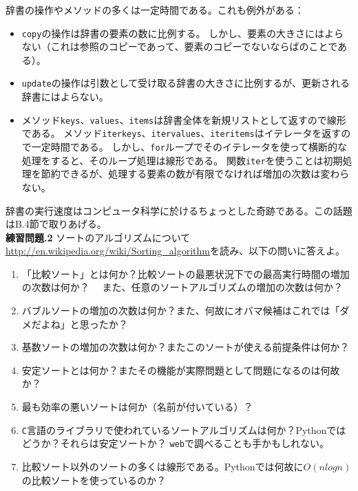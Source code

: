 \documentclass[a4j,12pt,makeidx]{jbook}
\newcommand{\tp}{\thechapter}
\begin{document}
辞書の操作やメソッドの多くは一定時間である。これも例外がある：
\begin{itemize}
\item {\tt copy}の操作は辞書の要素の数に比例する。
しかし、要素の大きさにはよらない（これは参照のコピーであって、要素のコピーでないならばのことである）。
\item {\tt update}の操作は引数として受け取る辞書の大きさに比例するが、更新される辞書にはよらない。
\item メソッド{\tt keys}、{\tt values}、{\tt items}は辞書全体を新規リストとして返すので線形である。
メソッド{\tt iterkeys}、{\tt itervalues}、{\tt iteritems}はイテレータを返すので一定時間である。
しかし、{\tt for}ループでそのイテレータを使って横断的な処理をすると、そのループ処理は線形である。
関数{\tt iter}を使うことは初期処理を節約できるが、処理する要素の数が有限でなければ増加の次数は変わらない。
\end{itemize}
辞書の実行速度はコンピュータ科学に於けるちょっとした奇跡である。この話題はB.4節で取りあげる。\\

\noindent
{\bf 練習問題\tp.2} ソートのアルゴリズムについて
\url{http://en.wikipedia.org/wiki/Sorting_algorithm}を読み、以下の問いに答えよ。
\begin{enumerate}
\item 「比較ソート」とは何か？比較ソートの最悪状況下での最高実行時間の増加の次数は何か？
　また、任意のソートアルゴリズムの増加の次数は何か？
\item バブルソートの増加の次数は何か？また、何故にオバマ候補はこれでは「ダメだよね」と思ったか？
\item 基数ソートの増加の次数は何か？またこのソートが使える前提条件は何か？
\item 安定ソートとは何か？またその機能が実際問題として問題になるのは何故か？
\item 最も効率の悪いソートは何か（名前が付いている）？
\item {\tt C}言語のライブラリで使われているソートアルゴリズムは何か？Pythonではどうか？それらは安定ソートか？
{\tt web}で調べることも手かもしれない。
\item 比較ソート以外のソートの多くは線形である。Pythonでは何故に$O(nlogn)$の比較ソートを使っているのか？
\end{enumerate}
%
\end{document}
